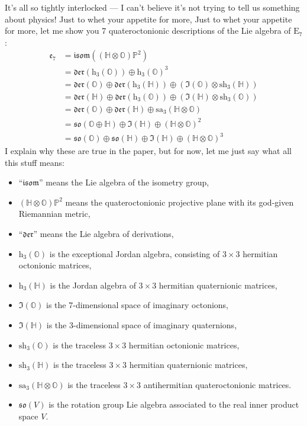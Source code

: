 \documentclass{article}
\def\tightlist{}
\begin{document}
It's all so tightly interlocked --- I can't believe it's not trying to
tell us something about physics! Just to whet your appetite for more,
Just to whet your appetite for more, let me show you 7 quateroctonionic
descriptions of the Lie algebra of \(\mathrm{E}_7\): \[
  \begin{aligned}
    \mathfrak{e}_7
    &= \mathfrak{isom}((\mathbb{H}\otimes\mathbb{O})\mathbb{P}^2)
  \\&= \mathfrak{der}(\mathrm{h}_3(\mathbb{O}))\oplus\mathrm{h}_3(\mathbb{O})^3
  \\&= \mathfrak{der}(\mathbb{O})\oplus\mathfrak{der}(\mathrm{h}_3(\mathbb{H}))\oplus(\Im(\mathbb{O})\otimes\mathrm{sh}_3(\mathbb{H}))
  \\&= \mathfrak{der}(\mathbb{H})\oplus\mathfrak{der}(\mathrm{h}_3(\mathbb{O}))\oplus(\Im(\mathbb{H})\otimes\mathrm{sh}_3(\mathbb{O}))
  \\&= \mathfrak{der}(\mathbb{O})\oplus\mathfrak{der}(\mathbb{H})\oplus\mathrm{sa}_3(\mathbb{H}\otimes\mathbb{O})
  \\&= \mathfrak{so}(\mathbb{O}\oplus\mathbb{H})\oplus\Im(\mathbb{H})\oplus(\mathbb{H}\otimes\mathbb{O})^2
  \\&= \mathfrak{so}(\mathbb{O})\oplus\mathfrak{so}(\mathbb{H})\oplus\Im(\mathbb{H})\oplus(\mathbb{H}\otimes\mathbb{O})^3
  \end{aligned}
\] I explain why these are true in the paper, but for now, let me just
say what all this stuff means:

\begin{itemize}
\tightlist
\item
  ``\(\mathfrak{isom}\)'' means the Lie algebra of the isometry group,
\item
  \((\mathbb{H}\otimes\mathbb{O})\mathbb{P}^2\) means the
  quateroctonionic projective plane with its god-given Riemannian
  metric,
\item
  ``\(\mathfrak{der}\)'' means the Lie algebra of derivations,
\item
  \(\mathrm{h}_3(\mathbb{O})\) is the exceptional Jordan algebra,
  consisting of \(3\times3\) hermitian octonionic matrices,
\item
  \(\mathrm{h}_3(\mathbb{H})\) is the Jordan algebra of \(3\times3\)
  hermitian quaternionic matrices,
\item
  \(\Im(\mathbb{O})\) is the 7-dimensional space of imaginary octonions,
\item
  \(\Im(\mathbb{H})\) is the 3-dimensional space of imaginary
  quaternions,
\item
  \(\mathrm{sh}_3(\mathbb{O})\) is the traceless \(3\times3\) hermitian
  octonionic matrices,
\item
  \(\mathrm{sh}_3(\mathbb{H})\) is the traceless \(3\times3\) hermitian
  quaternionic matrices,
\item
  \(\mathrm{sa}_3(\mathbb{H}\otimes\mathbb{O})\) is the traceless
  \(3\times3\) antihermitian quateroctonionic matrices.
\item
  \(\mathfrak{so}(V)\) is the rotation group Lie algebra associated to
  the real inner product space \(V\).
\end{itemize}
\end{document}
